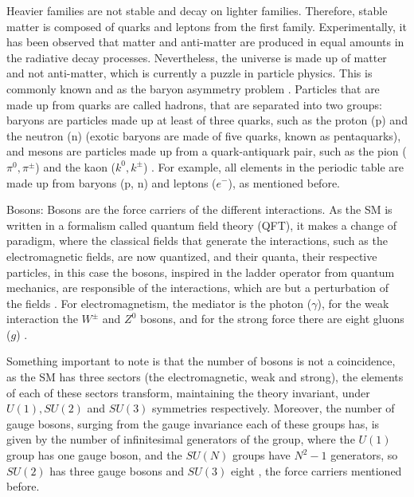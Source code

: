 Heavier families are not stable and decay on lighter families. Therefore, stable matter is composed of quarks and leptons from the first family. Experimentally, it has been observed that matter and anti-matter are produced in equal amounts in the radiative decay processes. Nevertheless, the universe is made up of matter and not anti-matter, which is currently a puzzle in particle physics. This is commonly known and as the baryon asymmetry problem \cite{Langacker}. Particles that are made up from quarks are called hadrons, that are separated into two groups: baryons are particles made up at least of three quarks, such as the proton (p) and the neutron (n) (exotic baryons are made of five quarks, known as pentaquarks), and mesons are particles made up from a quark-antiquark pair, such as the pion ($\pi^0, \pi^{\pm}$) and the kaon ($k^0, k^{\pm}$) \cite{Griffiths}. For example, all elements in the periodic table are made up from baryons (p, n) and leptons ($e^-$), as mentioned before.

Bosons: Bosons are the force carriers of the different interactions. As the SM is written in a formalism called quantum field theory (QFT), it makes a change of paradigm, where the classical fields that generate the interactions, such as the electromagnetic fields, are now quantized, and their quanta, their respective particles, in this case the bosons, inspired in the ladder operator from quantum mechanics, are responsible of the interactions, which are but a perturbation of the fields \cite{Lahiri}. For electromagnetism, the mediator is the photon ($\gamma$), for the weak interaction the $W^{\pm}$ and $Z^0$ bosons, and for the strong force there are eight gluons ($g$) \cite{Goldberg}. 

Something important to note is that the number of bosons is not a coincidence, as the SM has three sectors (the electromagnetic, weak and strong), the elements of each of these sectors transform, maintaining the theory invariant, under $U(1), SU(2)$ and $SU(3)$ symmetries respectively. Moreover, the number of gauge bosons, surging from the gauge invariance each of these groups has, is given by the number of infinitesimal generators of the group, where the $U(1)$ group has one gauge boson, and the $SU(N)$ groups have $N^2-1$ generators, so $SU(2)$ has three gauge bosons and $SU(3)$ eight \cite{Goldberg}, the force carriers mentioned before.

